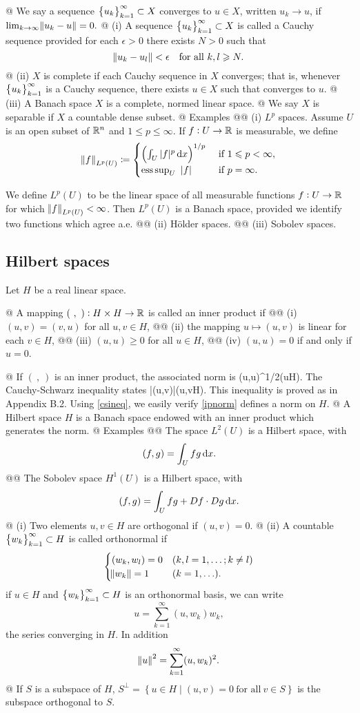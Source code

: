 @ We say a sequence $\big\{u_k\big\}_{k=1}^\infty\subset X$ converges to $u\in X$,
written $u_k\to u$, if $\lim_{k\to\infty}\norm{u_k-u}=0.$
@ (i) A sequence $\big\{u_k\big\}_{k=1}^\infty\subset X$ is called a Cauchy sequence provided for each
$\epsilon > 0$ there exists $N>0$ such that
$$\norm{u_k-u_l}<\epsilon\quad\text{for all}~k,l\geqslant N.$$
@ (ii) $X$ is complete if each Cauchy sequence in $X$ converges; that is,
whenever $\big\{u_k\big\}_{k=1}^\infty$ is a Cauchy sequence, there exists $u\in X$ such that
 converges to $u$.
@ (iii) A Banach space $X$ is a complete, normed linear space.
@ We say $X$ is separable if $X$ a countable dense subset.
@ Examples
@@ (i) $L^p$ spaces. Assume $U$ is an open subset of $\mathbb{R}^n$ and $1\leq
p\leq\infty$. If $f:U\to\mathbb{R}$ is measurable, we define
\begin{equation*}\norm{f}_{L^p(U)}\coloneqq\begin{cases} \left(\int_U |f|^p \mathop{}\!\mathrm{d}
    x\right)^{1/p}~&\text{if}~1\leqslant p<\infty,\\
\operatorname*{ess\,sup}_U~|f|~&\text{if}~p=\infty.\end{cases}\end{equation*}

We define $L^p(U)$ to be the linear space of all measurable functions $f:U\to\mathbb{R}$
for which $\norm{f}_{L^p(U)}<\infty$. Then $L^p(U)$ is a Banach space, provided
we identify two functions which agree a.e.
@@ (ii) H\"older spaces.
@@ (iii) Sobolev spaces.
\eeel
\subsection{Hilbert spaces}
Let $H$ be a real linear space.

\beeli
@ A mapping $(\ ,\ ):H\times H\to \mathbb{R}$ is called an inner product if
@@ (i) $(u, v) = (v, u)$ for all $u,v\in H$,
@@ (ii) the mapping $u\mapsto (u,v)$ is linear for each $v\in H$,
@@ (iii) $(u,u)\geq 0$ for all $u\in H$,
@@ (iv) $(u,u)=0$ if and only if $u=0$.

@ If $(\ ,\ )$ is an inner product, the associated norm is
\be\label{ipnorm} \coloneqq (u,u)^{1/2}\quad(u\in H).\ee
The Cauchy-Schwarz inequality states
\be\label{csineq} |(u,v)|\leq{}\quad(u,v\in H).\ee
This inequality is proved as in Appendix B.2. Using \eqref{csineq}, we easily
verify \eqref{ipnorm} defines a norm on $H$.
@ A Hilbert space $H$ is a Banach space endowed with an inner product which
generates the norm.
@ Examples
@@ The space $L^2(U)$ is a Hilbert space, with $$(f,g)=\int_U fg\mathop{}\!\mathrm{d} x.$$
@@ The Sobolev space $H^1(U)$ is a Hilbert space, with $$(f,g)=\int_U fg+Df\cdot
Dg\mathop{}\!\mathrm{d} x.$$
@ (i) Two elements $u,v\in H$ are orthogonal if $(u,v)=0$.
@ (ii) A countable $\big\{w_k\big\}_{k=1}^\infty\subset H$ is called orthonormal if
$$\begin{cases}(w_k,w_l)=0 & (k,l=1,\ldots;k\neq l)\\\norm{w_k}=1 &
    (k=1,\ldots).\end{cases}$$
    if $u\in H$ and $\big\{w_k\big\}_{k=1}^\infty\subset H$ is an orthonormal basis, we can write $$
    u=\sum_{k=1}^\infty(u,w_k)w_k,$$ the series converging in $H$. In addition
    $$\norm{u}^2=\sum_{k=1}^\infty(u,w_k)^2.$$
    @ If $S$ is a subspace of $H$, $S^\perp=\left\{u\in
    H\middle|(u,v)=0~\text{for all}~v\in S\right\}$ is the subspace orthogonal
    to $S$.
\eeel

